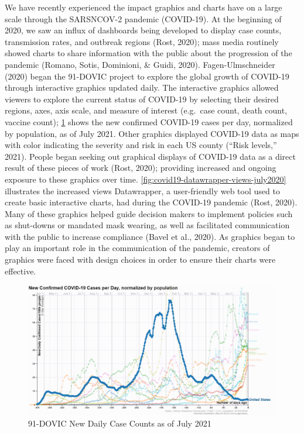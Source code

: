 \documentclass[print]{nuthesis}
\begin{document}
We have recently experienced the impact graphics and charts have on a large scale through the SARSNCOV-2 pandemic (COVID-19).
At the beginning of 2020, we saw an influx of dashboards being developed to display case counts, transmission rates, and outbreak regions (Rost, 2020); mass media routinely showed charts to share information with the public about the progression of the pandemic (Romano, Sotis, Dominioni, \& Guidi, 2020).
Fagen-Ulmschneider (2020) began the 91-DOVIC project to explore the global growth of COVID-19 through interactive graphics updated daily.
The interactive graphics allowed viewers to explore the current status of COVID-19 by selecting their desired regions, axes, axis scale, and measure of interest (e.g.~case count, death count, vaccine count); \cref{fig:91dovic-cases-july2021} shows the new confirmed COVID-19 cases per day, normalized by population, as of July 2021.
Other graphics displayed COVID-19 data as maps  with color indicating the severity and risk in each US county ({``Risk levels,''} 2021).
People began seeking out graphical displays of COVID-19 data as a direct result of these pieces of work (Rost, 2020); providing increased and ongoing exposure to these graphics over time.
\cref{fig:covid19-datawrapper-views-july2020} illustrates the increased views Datawrapper, a user-friendly web tool used to create basic interactive charts, had during the COVID-19 pandemic (Rost, 2020).
Many of these graphics helped guide decision makers to implement policies such as shut-downs or mandated mask wearing, as well as facilitated communication with the public to increase compliance (Bavel et al., 2020).
As graphics began to play an important role in the communication of the pandemic, creators of graphics were faced with design choices in order to ensure their charts were effective.

\begin{figure}[tbp]

{\centering \includegraphics[width=0.9\linewidth,]{images/91dovic-cases-july2021} 

}

\caption{91-DOVIC New Daily Case Counts as of July 2021}\label{fig:91dovic-cases-july2021}
\end{figure}
\end{document}
